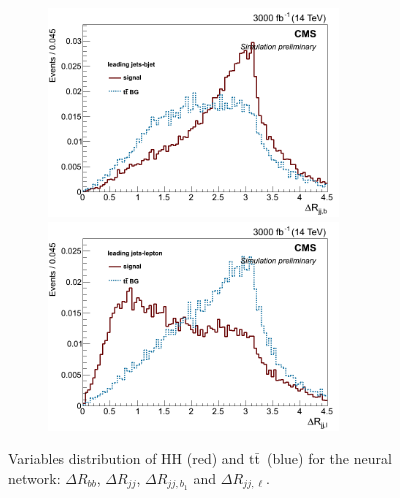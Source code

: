 \documentclass[10pt,a4paper]{article}
\newcommand{\ww}{7.7cm} %
\newcommand{\dd}{-2mm} %
\renewcommand{\tt}{$\text{t}\bar{\text{t}}$}
\begin{document}
\begin{figure}[h]
  \begin{subfigure}[b]{17cm}
    \begin{minipage}[h!]{\ww}
      \centering
      \includegraphics[width=\ww]{figs/DeltaR_jjb.png}
    \end{minipage}
    \begin{minipage}[h!]{\ww}
      \centering
      \includegraphics[width=\ww]{figs/DeltaR_jjl.png}
    \end{minipage}
    \hspace{9mm}
  \end{subfigure}	
  \vspace{\dd}
  \caption{Variables distribution of HH (red) and \tt\ (blue) for the neural network: $\Delta R_{bb}$, $\Delta R_{jj}$, $\Delta R_{jj,b_1}$ and $\Delta R_{jj,\ell}$.} \label{vars5}

\end{figure}
\end{document}
